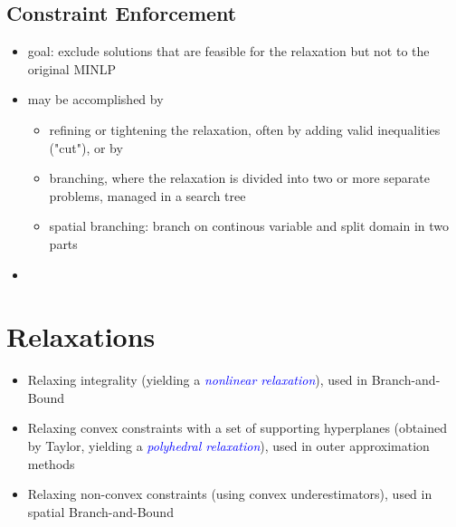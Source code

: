 \documentclass{article}
\begin{document}
\subsection{Constraint Enforcement}
\begin{itemize}
\item goal: exclude solutions that are feasible for the relaxation but not to the original MINLP
\item may be accomplished by 
\begin{itemize}
\item refining or tightening the relaxation, often by adding valid inequalities ("cut"), or by 
\item branching, where the relaxation is divided into two or more separate problems, managed in a search tree
\item spatial branching: branch on continous variable and split domain in two parts
\end{itemize}
\item 
\end{itemize} 
 
\section{Relaxations}
\begin{itemize}
\item Relaxing integrality (yielding a \textcolor{blue}{\textit{nonlinear relaxation}}), used in Branch-and-Bound
\item Relaxing convex constraints with a set of supporting hyperplanes (obtained by Taylor, yielding a \textcolor{blue}{\textit{polyhedral relaxation}}), used in outer approximation methods
\item Relaxing non-convex constraints (using convex underestimators), used in spatial Branch-and-Bound
\end{itemize}
\end{document}
